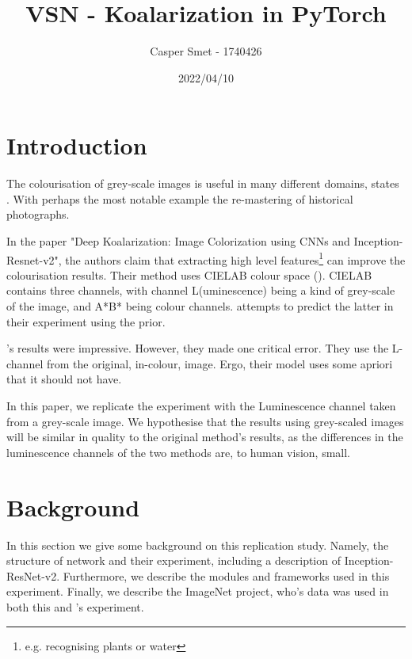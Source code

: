 \documentclass{article}
\title{VSN - Koalarization in PyTorch}
\author{Casper Smet - 1740426}
\date{2022/04/10}
\begin{document}
\maketitle

\section{Introduction}
    
    The colourisation of grey-scale images is useful in many different domains, states \cite{deepkoal2017}. With perhaps the most notable example the re-mastering of historical photographs.
    
    In the paper "Deep Koalarization: Image Colorization using CNNs and Inception-Resnet-v2", the authors claim that extracting high level features\footnote{e.g. recognising  plants or water} can improve the colourisation results.
    Their method uses CIELAB colour space (\cite{Luo2014}). CIELAB contains three channels, with channel L(uminescence) being a kind of grey-scale of the image, and A*B* being colour channels. \cite{deepkoal2017} attempts to predict the latter in their experiment using the prior.
    
    \cite{deepkoal2017}'s results were impressive. However, they made one critical error. They use the L-channel from the original, in-colour, image. Ergo, their model uses some apriori that it should not have.
    
    In this paper, we replicate the experiment with the Luminescence channel taken from a grey-scale image. We hypothesise that the results using grey-scaled images will be similar in quality to the original method's results, as the differences in the luminescence channels of the two methods are, to human vision, small.

\newpage
\tableofcontents
\newpage

\section{Background} \label{background}
    
    In this section we give some background on this replication study. Namely, the structure of \cite{deepkoal2017} network and their experiment, including a description of Inception-ResNet-v2. Furthermore, we describe the modules and frameworks used in this experiment. Finally, we describe the ImageNet project, who's data was used in both this and \cite{deepkoal2017}'s experiment.
    
\end{document}
